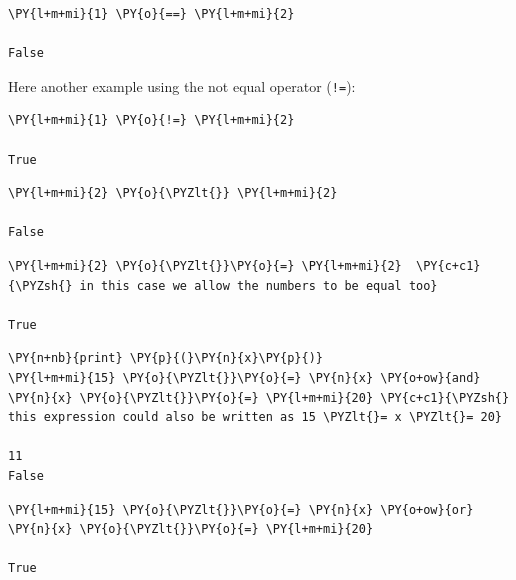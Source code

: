 \begin{codebox}
\begin{Verbatim}[commandchars=\\\{\}]
\PY{l+m+mi}{1} \PY{o}{==} \PY{l+m+mi}{2} 

False
\end{Verbatim}
\end{codebox}

Here another example using the not equal operator (\texttt{!=}):

\begin{codebox}
\begin{Verbatim}[commandchars=\\\{\}]
\PY{l+m+mi}{1} \PY{o}{!=} \PY{l+m+mi}{2}
  
True
\end{Verbatim}
\end{codebox}

\begin{codebox}
\begin{Verbatim}[commandchars=\\\{\}]
\PY{l+m+mi}{2} \PY{o}{\PYZlt{}} \PY{l+m+mi}{2}

False
\end{Verbatim}
\end{codebox}

\begin{codebox}
\begin{Verbatim}[commandchars=\\\{\}]
\PY{l+m+mi}{2} \PY{o}{\PYZlt{}}\PY{o}{=} \PY{l+m+mi}{2}  \PY{c+c1}{\PYZsh{} in this case we allow the numbers to be equal too}

True
\end{Verbatim}
\end{codebox}

\begin{codebox}
\begin{Verbatim}[commandchars=\\\{\}]
\PY{n+nb}{print} \PY{p}{(}\PY{n}{x}\PY{p}{)}
\PY{l+m+mi}{15} \PY{o}{\PYZlt{}}\PY{o}{=} \PY{n}{x} \PY{o+ow}{and} \PY{n}{x} \PY{o}{\PYZlt{}}\PY{o}{=} \PY{l+m+mi}{20} \PY{c+c1}{\PYZsh{} this expression could also be written as 15 \PYZlt{}= x \PYZlt{}= 20}

11
False
\end{Verbatim}
\end{codebox}

\begin{codebox}
\begin{Verbatim}[commandchars=\\\{\}]
\PY{l+m+mi}{15} \PY{o}{\PYZlt{}}\PY{o}{=} \PY{n}{x} \PY{o+ow}{or} \PY{n}{x} \PY{o}{\PYZlt{}}\PY{o}{=} \PY{l+m+mi}{20}

True
\end{Verbatim}
\end{codebox}

